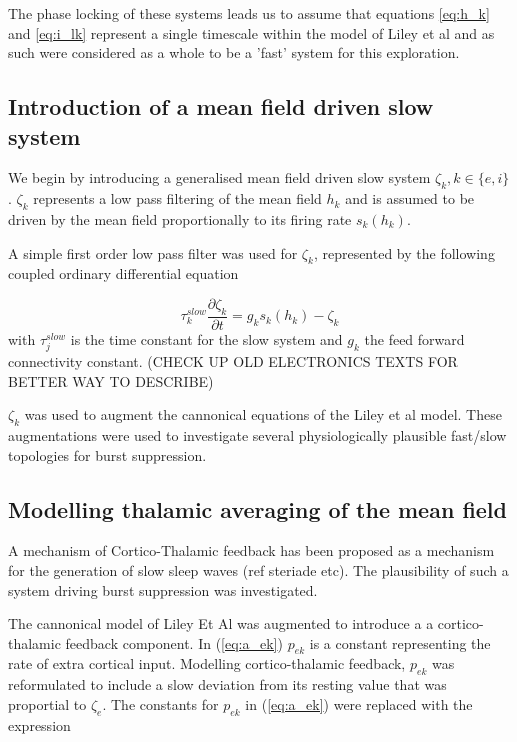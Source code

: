 \documentclass[a4paper,12pt]{article}
\begin{document}
The phase locking of these systems leads us to assume that equations \ref{eq:h_k} and \ref{eq:i_lk} represent a single
timescale within the model of Liley et al and as such were considered as a whole to be a 'fast' system for this
exploration.

\subsection{Introduction of a mean field driven slow system}

We begin by introducing a generalised mean field driven slow system $\zeta_{k}, k \in \{e, i\}$.  $\zeta_{k}$ represents a low pass filtering of the mean field $h_k$ and is assumed to be driven by the mean field proportionally to its firing rate $s_{k}(h_{k})$.

A simple first order low pass filter was used for $\zeta_k$, represented by the following coupled ordinary differential equation

\begin{equation} \label{eq:zeta_slow} 
\tau_k^{slow} \frac{\partial \zeta_k}{\partial t} = g_k s_k(h_k) - \zeta_k
\end{equation}
with $\tau_j^{slow}$ is the time constant for the slow system and $g_k$ the feed forward connectivity
constant. (CHECK UP OLD ELECTRONICS TEXTS FOR BETTER WAY TO DESCRIBE)

$\zeta_{k}$ was used to augment the cannonical equations of the Liley et al model. These augmentations were used to investigate several physiologically plausible fast/slow topologies for burst suppression.

\subsection{Modelling thalamic averaging of the mean field}
A mechanism of Cortico-Thalamic feedback has been proposed as a mechanism for the generation of slow sleep waves (ref steriade etc). 
The plausibility of such a system driving burst suppression was investigated. 

The cannonical model of Liley Et Al was augmented to introduce a a cortico-thalamic feedback component. 
In (\ref{eq:a_ek}) $p_{ek}$ is a constant representing the rate of extra cortical input. Modelling cortico-thalamic feedback, $p_{ek}$ was reformulated to include a slow deviation from its resting value that was proportial to $\zeta_e$. The constants for $p_{ek}$ in (\ref{eq:a_ek}) were replaced with the expression
\end{document}
